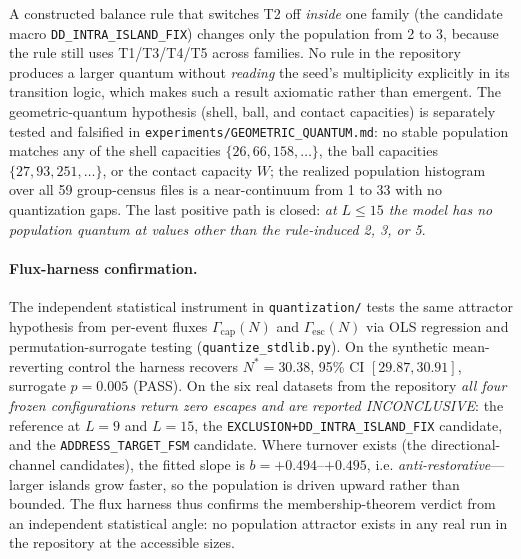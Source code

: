 \documentclass[a4paper]{article}
\begin{document}
A constructed balance rule that switches T2 off \emph{inside} one family (the candidate macro \texttt{DD\_INTRA\_ISLAND\_FIX}) changes only the population from 2 to 3, because the rule still uses T1/T3/T4/T5 across families. No rule in the repository produces a larger quantum without \emph{reading} the seed's multiplicity explicitly in its transition logic, which makes such a result axiomatic rather than emergent. The geometric-quantum hypothesis (shell, ball, and contact capacities) is separately tested and falsified in \texttt{experiments/GEOMETRIC\_QUANTUM.md}: no stable population matches any of the shell capacities $\{26, 66, 158, \dots\}$, the ball capacities $\{27, 93, 251, \dots\}$, or the contact capacity $W$; the realized population histogram over all 59 group-census files is a near-continuum from 1 to 33 with no quantization gaps. The last positive path is closed: \emph{at $L \le 15$ the model has no population quantum at values other than the rule-induced 2, 3, or 5}.
\paragraph{Flux-harness confirmation.} The independent statistical instrument in \texttt{quantization/} tests the same attractor hypothesis from per-event fluxes $\Gamma_{\mathrm{cap}}(N)$ and $\Gamma_{\mathrm{esc}}(N)$ via OLS regression and permutation-surrogate testing (\texttt{quantize\_stdlib.py}). On the synthetic mean-reverting control the harness recovers $N^* = 30.38$, 95\% CI $[29.87, 30.91]$, surrogate $p = 0.005$ (PASS). On the six real datasets from the repository \emph{all four frozen configurations return zero escapes and are reported INCONCLUSIVE}: the reference at $L = 9$ and $L = 15$, the \texttt{EXCLUSION+DD\_INTRA\_ISLAND\_FIX} candidate, and the \texttt{ADDRESS\_TARGET\_FSM} candidate. Where turnover exists (the directional-channel candidates), the fitted slope is $b = +0.494$--$+0.495$, i.e. \emph{anti-restorative}---larger islands grow faster, so the population is driven upward rather than bounded. The flux harness thus confirms the membership-theorem verdict from an independent statistical angle: no population attractor exists in any real run in the repository at the accessible sizes.
\end{document}
